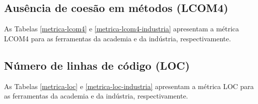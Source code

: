 
\subsection{Ausência de coesão em métodos (LCOM4)}

As Tabelas \ref{metrica-lcom4} e \ref{metrica-lcom4-industria} apresentam a
métrica LCOM4 para as ferramentas da academia e da indústria, respectivamente.



\subsection{Número de linhas de código (LOC)}

As Tabelas \ref{metrica-loc} e \ref{metrica-loc-industria} apresentam a
métrica LOC para as ferramentas da academia e da indústria, respectivamente.


